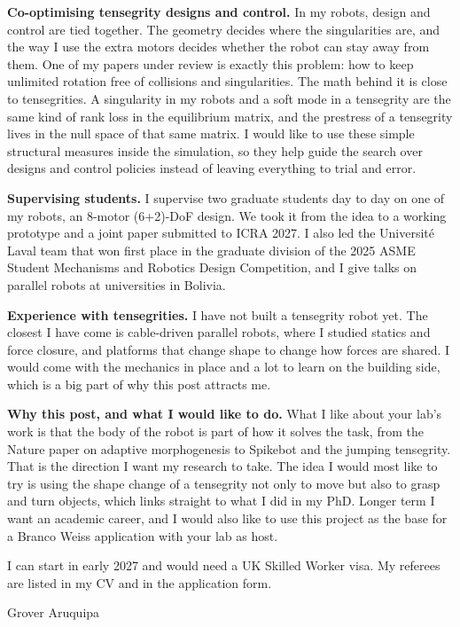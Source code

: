 \documentclass[11pt,a4paper]{article}
\begin{document}
\textbf{Co-optimising tensegrity designs and control.}
In my robots, design and control are tied together. The geometry decides where the singularities are, and the way I use the extra motors decides whether the robot can stay away from them. One of my papers under review is exactly this problem: how to keep unlimited rotation free of collisions and singularities. The math behind it is close to tensegrities. A singularity in my robots and a soft mode in a tensegrity are the same kind of rank loss in the equilibrium matrix, and the prestress of a tensegrity lives in the null space of that same matrix. I would like to use these simple structural measures inside the simulation, so they help guide the search over designs and control policies instead of leaving everything to trial and error.

\textbf{Supervising students.}
I supervise two graduate students day to day on one of my robots, an 8-motor (6+2)-DoF design. We took it from the idea to a working prototype and a joint paper submitted to ICRA 2027. I also led the Universit\'e Laval team that won first place in the graduate division of the 2025 ASME Student Mechanisms and Robotics Design Competition, and I give talks on parallel robots at universities in Bolivia.

\textbf{Experience with tensegrities.}
I have not built a tensegrity robot yet. The closest I have come is cable-driven parallel robots, where I studied statics and force closure, and platforms that change shape to change how forces are shared. I would come with the mechanics in place and a lot to learn on the building side, which is a big part of why this post attracts me.

\textbf{Why this post, and what I would like to do.}
What I like about your lab's work is that the body of the robot is part of how it solves the task, from the Nature paper on adaptive morphogenesis to Spikebot and the jumping tensegrity. That is the direction I want my research to take. The idea I would most like to try is using the shape change of a tensegrity not only to move but also to grasp and turn objects, which links straight to what I did in my PhD. Longer term I want an academic career, and I would also like to use this project as the base for a Branco Weiss application with your lab as host.

I can start in early 2027 and would need a UK Skilled Worker visa. My referees are listed in my CV and in the application form.

Grover Aruquipa
\end{document}
